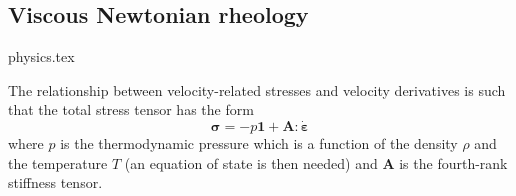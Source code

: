 \subsection{Viscous Newtonian rheology}
\begin{flushright} {\tiny {\color{gray} physics.tex}} \end{flushright}

The relationship between velocity-related stresses and
velocity derivatives is such that the total stress tensor has the form \cite{berc09}
\begin{equation}
{\bm \sigma} = -p {\bm 1} + {\bm A}:\dot{\bm \varepsilon}
\end{equation}
where $p$ is the thermodynamic pressure which is a function of the density $\rho$ and the temperature $T$ (an equation of state is then needed)
and ${\bm A}$ is the fourth-rank stiffness tensor.

